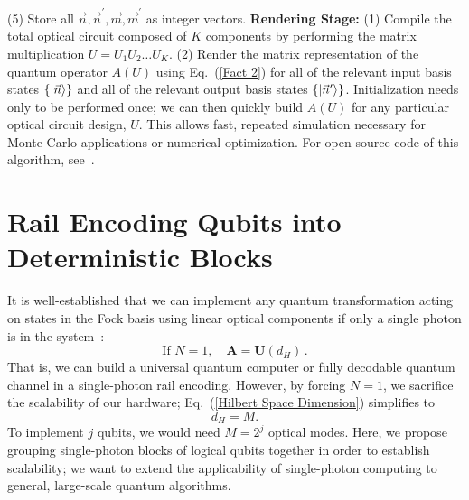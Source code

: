\documentclass[aps,pra,twocolumn,showpacs,superscriptaddress,floatfix,10pt]{revtex4}
\begin{document}
		\newline
		\newline
		(5) Store all $\vec{n}, \vec{n}^\prime, \vec{m}, \vec{m}^\prime$ as integer vectors.
		\newline
		\newline
\textbf{Rendering Stage:}
\newline
\newline
		(1)  Compile the total optical circuit composed of $K$ components by performing the matrix multiplication $ U = U_1 U_2 \dots U_K $.
		\newline
		\newline
		(2) Render the matrix representation of the quantum operator $A(U)$ using Eq.~(\ref{Fact 2}) for all of the relevant input basis states $\{\ket{\vec{n}}\}$ and all of the relevant output basis states $\{\ket{\vec{n}^\prime}\}$.
\newline
\newline \indent
 Initialization needs only to be performed once; we can then quickly build $A(U)$ for any particular optical circuit design, $U$. This allows fast, repeated simulation necessary for Monte Carlo applications or numerical optimization. For open source code of this algorithm, see~\cite{GitHub}.
\section{Rail Encoding Qubits into Deterministic Blocks}
\label{Section Block Encoding}
It is well-established that we can implement any quantum transformation acting on states in the Fock basis using linear optical components if only a single photon is in the system~\cite{Adami,Torma,Pittman}:
\begin{equation}
\label{Isomorphism}
	\mbox{If } N=1, \quad \textbf{A} = \textbf{U}(d_H)\,.
\end{equation}
That is, we can build a universal quantum computer or fully decodable quantum channel in a single-photon rail encoding. However, by forcing $N=1$, we sacrifice the scalability of our hardware; Eq.~(\ref{Hilbert Space Dimension}) simplifies to
\begin{equation}
d_H = M.
\end{equation}
To implement $j$ qubits, we would need $M=2^j$ optical modes. Here, we propose grouping single-photon blocks of logical qubits together in order to establish scalability; we want to extend the applicability of single-photon computing to general, large-scale quantum algorithms. 
\end{document}
